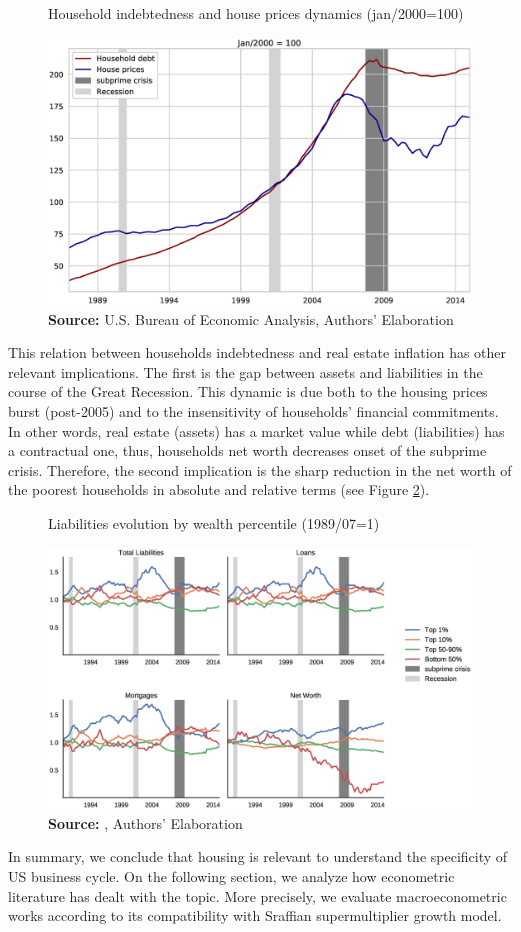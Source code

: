 \begin{figure}[H]
	\centering
	\caption{Household indebtedness and house prices dynamics (jan/2000=100)}
	\label{FigDividaPreco}
	\includegraphics[width=\textwidth]{./figs/Divida_PrecoImoveis.eps}
	\caption*{\textbf{Source:} U.S. Bureau of Economic Analysis, Authors' Elaboration}
\end{figure}
This relation between households indebtedness and real estate inflation has other relevant implications.
The first is the gap between assets and liabilities in the course of the Great Recession.
This dynamic is due both to the housing prices burst (post-2005) and to the insensitivity of households' financial commitments.
In other words, real estate (assets) has a market value while debt (liabilities) has a contractual one, thus, households net worth decreases onset of the subprime crisis.
Therefore, the second implication is the sharp reduction in the net worth of the poorest households in absolute and relative terms (see Figure \ref{FigDistPassivos}).


\begin{figure}
	\centering
	\caption{Liabilities evolution by wealth percentile (1989/07=1)}
	\label{FigDistPassivos}
	\includegraphics[width=.8\textwidth]{./figs/Distribuicao_Passivos.eps}
	\caption*{\textbf{Source:} \textcite{us_census_bureau_characteristics_2017}, Authors' Elaboration}
\end{figure}

In summary, we conclude that housing is relevant to understand the specificity of US business cycle.
On the following section, we analyze how econometric literature has dealt with the topic.
More precisely, we evaluate macroeconometric works according to its compatibility with Sraffian supermultiplier growth model.
